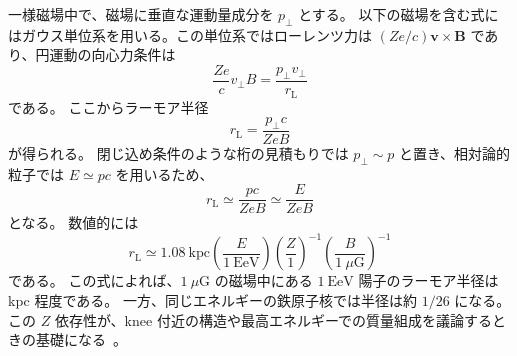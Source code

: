 \documentclass[book,paper=a4,fontsize=11pt]{jlreq}
\begin{document}
一様磁場中で、磁場に垂直な運動量成分を \(p_{\perp}\) とする。
以下の磁場を含む式にはガウス単位系を用いる。この単位系ではローレンツ力は \((Ze/c)\boldsymbol{v}\times\boldsymbol{B}\) であり、円運動の向心力条件は
\begin{equation}
  \frac{Ze}{c}v_{\perp}B
  =
  \frac{p_{\perp}v_{\perp}}{r_{\mathrm{L}}}
\end{equation}
である。
ここからラーモア半径
\begin{equation}
  r_{\mathrm{L}}
  =
  \frac{p_{\perp}c}{ZeB}
\end{equation}
が得られる。
閉じ込め条件のような桁の見積もりでは \(p_{\perp}\sim p\) と置き、相対論的粒子では \(E\simeq pc\) を用いるため、
\begin{equation}
  r_{\mathrm{L}}
  \simeq
  \frac{pc}{ZeB}
  \simeq
  \frac{E}{ZeB}
  \label{eq:larmor_radius}
\end{equation}
となる。
数値的には
\begin{equation}
  r_{\mathrm{L}}
  \simeq
  1.08\ \mathrm{kpc}
  \left(\frac{E}{1\ \mathrm{EeV}}\right)
  \left(\frac{Z}{1}\right)^{-1}
  \left(\frac{B}{1\ \mu\mathrm{G}}\right)^{-1}
\end{equation}
である。
この式によれば、\(1\ \mu\mathrm{G}\) の磁場中にある \(1\ \mathrm{EeV}\) 陽子のラーモア半径は kpc 程度である。
一方、同じエネルギーの鉄原子核では半径は約 \(1/26\) になる。
この \(Z\) 依存性が、knee 付近の構造や最高エネルギーでの質量組成を議論するときの基礎になる~\cite{PDGCosmicRays,Gabici2019}。
\end{document}

